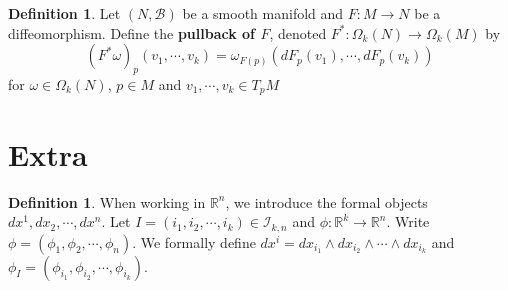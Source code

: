 \documentclass[12pt]{amsart}
\theoremstyle{definition}
\newtheorem{defn}[definition]{Definition}
\newcommand{\om}{\omega}
\newcommand{\Om}{\Omega}
\newcommand{\R}{\mathbb{R}}
\newcommand{\MB}{\mathcal{B}}
\newcommand{\MI}{\mathcal{I}}
\begin{document}
	
	\begin{defn}
		Let $(N, \MB)$ be a smooth manifold and $F: M \rightarrow N$ be a diffeomorphism. Define the \textbf{pullback of $F$}, denoted $F^*: \Om_k(N) \rightarrow \Om_k(M)$ by  $$(F^* \om)_p (v_1, \cdots, v_k) = \om_{F(p)} (dF_p(v_1), \cdots, dF_p(v_k))$$ for $\om \in \Om_k(N)$, $p \in M$ and $v_1, \cdots, v_k \in T_{p}M$
	\end{defn}










	
	
	
	
	
	
	
	
	
	
	
	
	
	
	
	
	
	
	
	
	\newpage 
	\section{Extra}
	\begin{defn}
		When working in $\R^n$, we introduce the formal objects $dx^1, dx_2, \cdots, dx^n$. Let $I = (i_1, i_2, \cdots, i_k)\in \MI_{k,n}$ and $\phi: \R^k \rightarrow \R^n$. Write $\phi = (\phi_1, \phi_2, \cdots, \phi_n)$. We formally define $dx^i = dx_{i_1}\wedge dx_{i_2} \wedge \cdots \wedge dx_{i_k}$ and $\phi_I = (\phi_{i_1}, \phi_{i_2}, \cdots, \phi_{i_k})$.   
	\end{defn}
	
\end{document}
